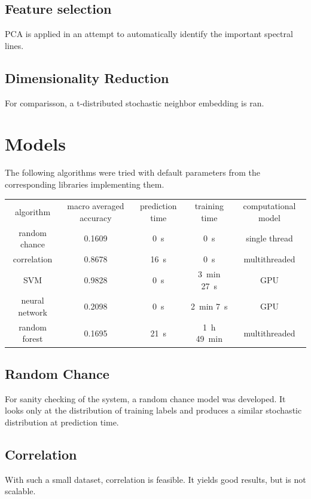 \documentclass{article}
\begin{document}
\subsection{Feature selection}
PCA is applied in an attempt to automatically identify the important spectral lines.


\subsection{Dimensionality Reduction}
For comparisson, a t-distributed stochastic neighbor embedding is ran.


\section{Models}
The following algorithms were tried with default parameters from the corresponding libraries implementing them.
\\ \par
{}
\begin{tabular}{ c | c | c | c | c }
algorithm      & macro averaged accuracy & prediction time  & training time                    & computational model \\
random chance  & 0.1609                  & \SI{0}{\second}  & \SI{0}{\second}                  & single thread \\
correlation    & 0.8678                  & \SI{16}{\second} & \SI{0}{\second}                  & multithreaded \\
SVM            & 0.9828                  & \SI{0}{\second}  & \SI{3}{\minute} \SI{27}{\second} & GPU \\
neural network & 0.2098                  & \SI{0}{\second}  & \SI{2}{\minute} \SI{7}{\second}  & GPU \\
random forest  & 0.1695                  & \SI{21}{\second} & \SI{1}{\hour} \SI{49}{\minute}   & multithreaded \\
\end{tabular}


\subsection{Random Chance}
For sanity checking of the system, a random chance model was developed.
It looks only at the distribution of training labels and produces a similar stochastic distribution at prediction time.


\subsection{Correlation}
With such a small dataset, correlation is feasible.
It yields good results, but is not scalable.
\end{document}
